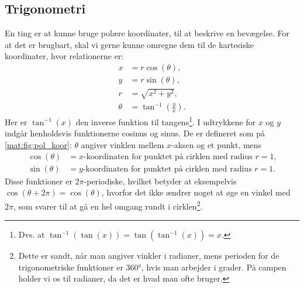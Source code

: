 \subsection{Trigonometri}
En ting er at kunne bruge polære koordinater, til at beskrive en bevægelse. For at det er brugbart, skal vi gerne kunne omregne dem til de kartesiske koordinater, hvor relationerne er:
%
\begin{subequations} \label{mat:eq:kartesisk/polaer}
\begin{align}
    x &= r \cos(\theta), \label{mat:eq:kartesisk/polaer_x} \\
    y &= r \sin(\theta), \label{mat:eq:kartesisk/polaer_y} \\
    r &= \sqrt{x^2 + y^2}, \label{mat:eq:kartesisk/polaer_r} \\
    \theta &= \tan^{-1}\left(\frac{y}{x}\right). \label{mat:eq:kartesisk/polaer_theta}
\end{align}
\end{subequations}
%
Her er $\tan^{-1}(x)$ den inverse funktion til tangens\footnote{Dvs. at $\tan^{-1} \left( \tan(x) \right) = \tan \left( \tan^{-1}(x) \right) = x$.}. I udtrykkene for $x$ og $y$ indgår henholdsvis funktionerne cosinus og sinus. De er defineret som på \cref{mat:fig:pol_koor}: $\theta$ angiver vinklen mellem $x$-aksen og et punkt, mens
%
\begin{align*}
    \cos(\theta) &= \text{$x$-koordinaten for punktet på cirklen med
	radius $r = 1$,}\\
    \sin(\theta) &= \text{$y$-koordinaten for punktet på cirklen med
	radius $r = 1$.}
\end{align*}
%
Disse funktioner er $2\pi$-periodiske, hvilket betyder at eksempelvis $\cos(\theta + 2\pi) = \cos(\theta)$, hvorfor det ikke ændrer noget at øge en vinkel med $2\pi$, som svarer til at gå en hel omgang rundt i cirklen\footnote{Dette er sandt, når man angiver vinkler i radianer, mens perioden for de trigonometriske funktioner er \ang{360}, hvis man arbejder i grader. På campen holder vi os til radianer, da det er hvad man ofte bruger.}.


